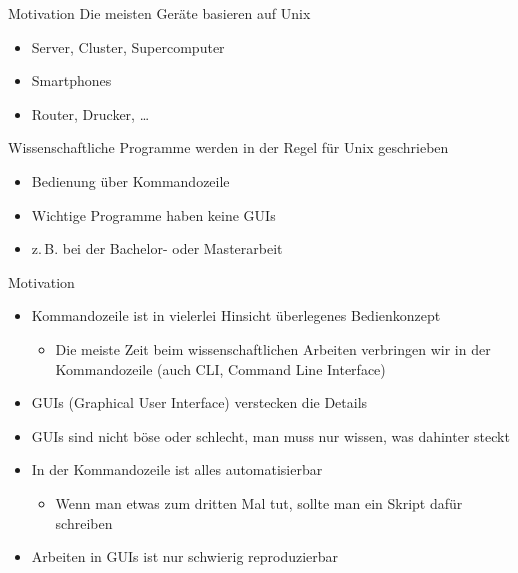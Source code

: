 \begin{frame}{Motivation}
  Die meisten Geräte basieren auf Unix
  \begin{itemize}
    \item Server, Cluster, Supercomputer
    \item Smartphones
    \item Router, Drucker, …
  \end{itemize}
  Wissenschaftliche Programme werden in der Regel für Unix geschrieben
  \begin{itemize}
    \item Bedienung über Kommandozeile
    \item Wichtige Programme haben keine GUIs
    \item z.\,B. bei der Bachelor- oder Masterarbeit
  \end{itemize}
\end{frame}

\begin{frame}{Motivation}
  \begin{itemize}
    \item Kommandozeile ist in vielerlei Hinsicht überlegenes Bedienkonzept
      \begin{itemize}
        \item Die meiste Zeit beim wissenschaftlichen Arbeiten verbringen wir in der Kommandozeile (auch CLI, Command Line Interface)
      \end{itemize}
    \item GUIs (Graphical User Interface) verstecken die Details
    \item GUIs sind nicht böse oder schlecht, man muss nur wissen, was dahinter steckt
    \item In der Kommandozeile ist alles automatisierbar
      \begin{itemize}
        \item Wenn man etwas zum dritten Mal tut, sollte man ein Skript dafür schreiben
      \end{itemize}
    \item Arbeiten in GUIs ist nur schwierig reproduzierbar
  \end{itemize}
\end{frame}

